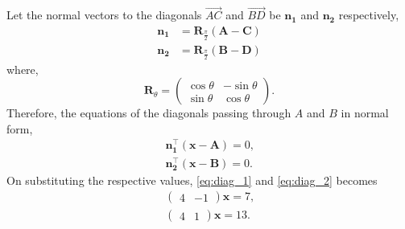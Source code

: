 \documentclass[journal,12pt,twocolumn]{IEEEtran}
\let\vec\mathbf
\newcommand{\myvec}[1]{\ensuremath{\begin{pmatrix}#1\end{pmatrix}}}
\providecommand{\brak}[1]{\ensuremath{\left(#1\right)}}
\begin{document}

\newpage
Let the normal vectors to the diagonals $\overrightarrow{AC}$ and $\overrightarrow{BD}$ be $\vec{n_1}$ and $\vec{n_2}$ respectively,
\begin{align}
	\vec{n_1} &= \vec{R}_{\frac{\pi}{2}} \brak{\vec{A-C}} \\
	\vec{n_2} &= \vec{R}_{\frac{\pi}{2}} \brak{\vec{B-D}}
\end{align}
where, \[ \vec{R}_{\theta} = \myvec{\cos  \theta & -\sin \theta \\ \sin \theta & \cos \theta} \text{.} \]
Therefore, the equations of the diagonals passing through $A$ and $B$ in normal form, 
\begin{align}
		\vec{n_1^{\top}}\brak{{\vec{x}-\vec{A}}} = 0\text{,} \label{eq:diag_1}\\
		\vec{n_2^{\top}}\brak{{\vec{x}-\vec{B}}} = 0\text{.} \label{eq:diag_2}
\end{align}
On substituting the respective values, \eqref{eq:diag_1} and \eqref{eq:diag_2} becomes
\begin{align*}
	\myvec{4&-1}\vec{x} = 7 \text{,}\\
	\myvec{4&1}\vec{x} = 13 \text{.}
\end{align*}
%

\end{document}
